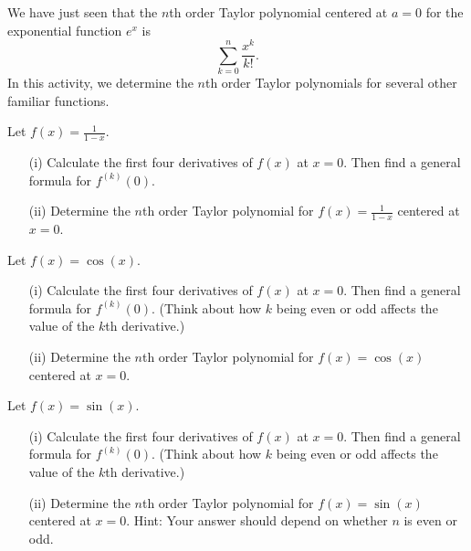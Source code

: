 \begin{activity} \label{8.5.Act2} We have just seen that the $n$th order Taylor polynomial centered at $a = 0$ for the exponential function $e^x$ is
 \[\sum_{k=0}^{n} \frac{x^k}{k!}.\]
In this activity, we determine the $n$th order Taylor polynomials for several other familiar functions. 
\ba
\item Let $f(x) = \frac{1}{1-x}$.
    \begin{itemize}
    \item[(i)] Calculate the first four derivatives of $f(x)$ at $x=0$. Then find a general formula for $f^{(k)}(0)$.

    \item[(ii)]  Determine the $n$th order Taylor polynomial for $f(x) = \frac{1}{1-x}$ centered at $x=0$.

    \end{itemize}


\item Let $f(x) = \cos(x)$.
    \begin{itemize}
    \item[(i)] Calculate the first four derivatives of $f(x)$ at $x=0$. Then find a general formula for $f^{(k)}(0)$.  (Think about how $k$ being even or odd affects the value of the $k$th derivative.)

    \item[(ii)] Determine the $n$th order Taylor polynomial for $f(x) = \cos(x)$ centered at $x=0$. 

    \end{itemize}

\item Let $f(x) = \sin(x)$.
    \begin{itemize}
    \item[(i)] Calculate the first four derivatives of $f(x)$ at $x=0$. Then find a general formula for $f^{(k)}(0)$.  (Think about how $k$ being even or odd affects the value of the $k$th derivative.)

    \item[(ii)] Determine the $n$th order  Taylor polynomial for $f(x) = \sin(x)$ centered at $x=0$.  Hint: Your answer should depend on whether $n$ is even or odd.

    \end{itemize}


 \ea


\end{activity}

